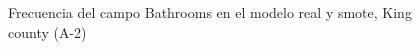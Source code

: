 \begin{figure}[H]
    \centering
    
    \caption{Frecuencia del campo Bathrooms en el modelo real y smote, King county (A-2)}
    \label{frecuency-smote-bathrooms}
\end{figure}
